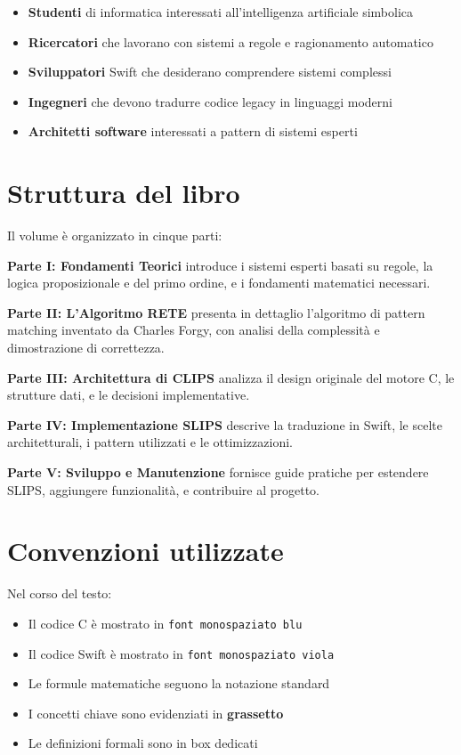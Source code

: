 \documentclass[12pt,a4paper,twoside,openright]{book}
\theoremstyle{definition}
\theoremstyle{remark}
\begin{document}
\begin{itemize}
\item \textbf{Studenti} di informatica interessati all'intelligenza artificiale simbolica
\item \textbf{Ricercatori} che lavorano con sistemi a regole e ragionamento automatico
\item \textbf{Sviluppatori} Swift che desiderano comprendere sistemi complessi
\item \textbf{Ingegneri} che devono tradurre codice legacy in linguaggi moderni
\item \textbf{Architetti software} interessati a pattern di sistemi esperti
\end{itemize}

\section*{Struttura del libro}

Il volume è organizzato in cinque parti:

\textbf{Parte I: Fondamenti Teorici} introduce i sistemi esperti basati su regole, la logica proposizionale e del primo ordine, e i fondamenti matematici necessari.

\textbf{Parte II: L'Algoritmo RETE} presenta in dettaglio l'algoritmo di pattern matching inventato da Charles Forgy, con analisi della complessità e dimostrazione di correttezza.

\textbf{Parte III: Architettura di CLIPS} analizza il design originale del motore C, le strutture dati, e le decisioni implementative.

\textbf{Parte IV: Implementazione SLIPS} descrive la traduzione in Swift, le scelte architetturali, i pattern utilizzati e le ottimizzazioni.

\textbf{Parte V: Sviluppo e Manutenzione} fornisce guide pratiche per estendere SLIPS, aggiungere funzionalità, e contribuire al progetto.

\section*{Convenzioni utilizzate}

Nel corso del testo:
\begin{itemize}
\item Il codice C è mostrato in \texttt{font monospaziato blu}
\item Il codice Swift è mostrato in \texttt{font monospaziato viola}
\item Le formule matematiche seguono la notazione standard
\item I concetti chiave sono evidenziati in \textbf{grassetto}
\item Le definizioni formali sono in box dedicati
\end{itemize}
\end{document}
